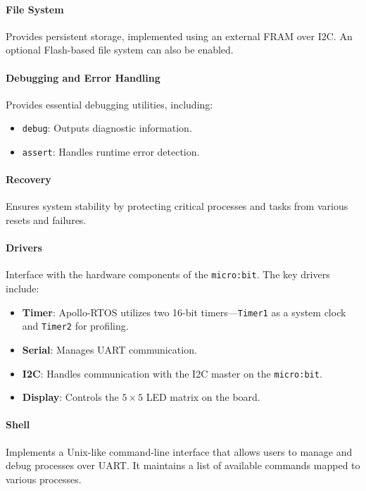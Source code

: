 \paragraph*{File System} Provides persistent storage, implemented using an external
FRAM over I2C. An optional Flash-based file system can also be enabled.

\paragraph*{Debugging and Error Handling} Provides essential debugging utilities,
including:
\begin{itemize}
    \item \texttt{debug}: Outputs diagnostic information.
    \item \texttt{assert}: Handles runtime error detection.
\end{itemize}

\paragraph*{Recovery} Ensures system stability by protecting critical processes and
tasks from various resets and failures.

\paragraph*{Drivers} Interface with the hardware components of the \texttt{micro:bit}.
The key drivers include:
\begin{itemize}
    \item \textbf{Timer}: Apollo-RTOS utilizes two 16-bit timers—\texttt{Timer1} as a
        system clock and \texttt{Timer2} for profiling.
    \item \textbf{Serial}: Manages UART communication.
    \item \textbf{I2C}: Handles communication with the I2C master on the
        \texttt{micro:bit}.
    \item \textbf{Display}: Controls the \(5 \times 5\) LED matrix on the board.
\end{itemize}

\paragraph*{Shell} Implements a Unix-like command-line interface that allows users to
manage and debug processes over UART. It maintains a list of available commands mapped
to various processes.


